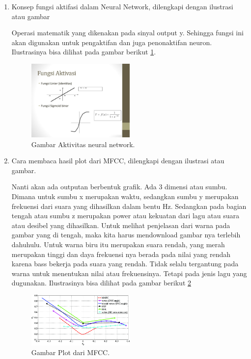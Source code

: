 \begin{enumerate}
\item Konsep fungsi aktifasi dalam Neural Network, dilengkapi dengan ilustrasi atau gambar
\par Operasi matematik yang dikenakan pada sinyal output y. Sehingga fungsi ini akan digunakan untuk pengaktifan dan juga penonaktifan neuron. Ilustrasinya bisa dilihat pada gambar berikut  \ref{no4}.
	\begin{figure}[ht]
	\centerline{\includegraphics[width=0.5\textwidth]{figures/chapter6/no4.jpg}}
	\caption{Gambar Aktivitas neural network.}
	\label{no4}
	\end{figure}

\item Cara membaca hasil plot dari MFCC, dilengkapi dengan ilustrasi atau gambar.
\par Nanti akan ada outputan berbentuk grafik. Ada 3 dimensi atau sumbu. Dimana untuk sumbu x merupakan waktu, sedangkan sumbu y merupakan frekuensi dari suara yang dihasilkan dalam bentu Hz. Sedangkan pada bagian tengah atau sumbu z merupakan power atau kekuatan dari lagu atau suara atau desibel yang dihasilkan. Untuk melihat penjelasan dari warna pada gambar yang di tengah, maka kita harus mendownload gambar nya terlebih dahuhulu. Untuk warna biru itu merupakan suara rendah, yang merah merupakan tinggi dan daya frekuensi nya berada pada nilai yang rendah karena bass bekerja pada suara yang rendah. Tidak selalu tergantung pada warna untuk menentukan nilai atau frekuensinya. Tetapi pada jenis lagu yang dugunakan.  Ilustrasinya bisa dilihat pada gambar berikut \ref{no5m}
	\begin{figure}[ht]
	\centerline{\includegraphics[width=0.5\textwidth]{figures/chapter6/no5.png}}
	\caption{Gambar Plot dari MFCC.}
	\label{no5m}
	\end{figure}


\end{enumerate}
